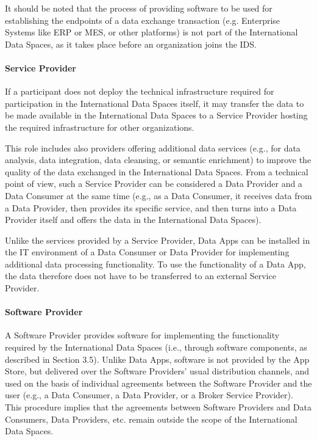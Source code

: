 It should be noted that the process of providing software to be used for establishing the endpoints of a data exchange transaction (e.g. Enterprise Systems like ERP or MES, or other platforms) is not part of the International Data Spaces, as it takes place before an organization joins the IDS.



\paragraph{Service Provider}
If a participant does not deploy the technical infrastructure required for participation in the International Data Spaces itself, it may transfer the data to be made available in the International Data Spaces to a Service Provider hosting the required infrastructure for other organizations.

This role includes also providers offering additional data services (e.g., for data analysis, data integration, data cleansing, or semantic enrichment) to improve the quality of the data exchanged in the International Data Spaces. From a technical point of view, such a Service Provider can be considered a Data Provider and a Data Consumer at the same time (e.g., as a Data Consumer, it receives data from a Data Provider, then provides its specific service, and then turns into a Data Provider itself and offers the data in the International Data Spaces). 

Unlike the services provided by a Service Provider, Data Apps can be installed in the IT environment of a Data Consumer or Data Provider for implementing additional data processing functionality. To use the functionality of a Data App, the data therefore does not have to be transferred to an external Service Provider.

\paragraph{Software Provider}
A Software Provider provides software for implementing the functionality required by the International Data Spaces (i.e., through software components, as described in Section 3.5). Unlike Data Apps, software is not provided by the App Store, but delivered over the Software Providers’ usual distribution channels, and used on the basis of individual agreements between the Software Provider and the user (e.g., a Data Consumer, a Data Provider, or a Broker Service Provider). This procedure implies that the agreements between Software Providers and Data Consumers, Data Providers, etc. remain outside the scope of the International Data Spaces.

